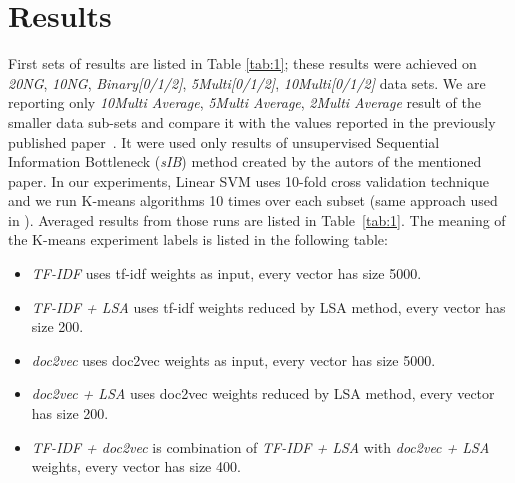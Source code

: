\documentclass[runningheads,a4paper]{llncs}
\begin{document}
\section{Results}
\label{sec:results}

First sets of results are listed in Table \ref{tab:1}; these results were achieved on \emph{20NG}, \emph{10NG}, \emph{Binary[0/1/2]}, \emph{5Multi[0/1/2]}, \emph{10Multi[0/1/2]} data sets. We are reporting only \emph{10Multi Average}, \emph{5Multi Average}, \emph{2Multi Average} result of the smaller data sub-sets and compare it with the values reported in the previously published paper~\cite{refVysEval}. It were used only results of unsupervised Sequential Information Bottleneck (\emph{sIB}) method created by the autors of the mentioned paper. In our experiments, Linear SVM uses 10-fold cross validation technique and we run K-means algorithms 10 times over each subset (same approach used in \cite{refVysEval}). Averaged results from those runs are listed in Table~\ref{tab:1}. The meaning of the K-means experiment labels is listed in the following table:
\begin{itemize}
\item \emph{TF-IDF} uses tf-idf weights as input, every vector has size 5000. 
\item \emph{TF-IDF + LSA} uses tf-idf weights reduced by LSA method, every vector has size 200.
\item \emph{doc2vec} uses doc2vec weights as input, every vector has size 5000. 
\item \emph{doc2vec + LSA} uses doc2vec weights reduced by LSA method, every vector has size 200.
\item \emph{TF-IDF + doc2vec} is combination of \emph{TF-IDF + LSA} with \emph{doc2vec + LSA} weights, every vector has size 400.
\end{itemize}
\end{document}
